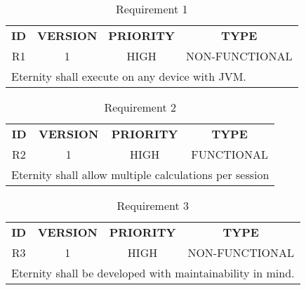 \documentclass[11pt,a4paper]{report}
\theoremstyle{definition}
\theoremstyle{remark}
\begin{document}
        \begin{table}[ht]
            \centering
                \begin{tabular}{cccc} %
                    \textbf{ID} & \textbf{VERSION} & \textbf{PRIORITY} & \textbf{TYPE}\\
                            R1  &           1      &           HIGH    &      NON-FUNCTIONAL\\
                    \hline
                    \multicolumn{4}{l}{Eternity shall execute on any device with JVM.}
                \end{tabular}
                \caption{Requirement 1}
                \label{tab:table-requirements-1}
            \end{table}
            \vspace{3em}
            
            \begin{table}[ht]
            \centering
                \begin{tabular}{cccc} %
                    \textbf{ID} & \textbf{VERSION} & \textbf{PRIORITY} & \textbf{TYPE}\\
                            R2  &           1      &           HIGH    &      FUNCTIONAL\\
                    \hline
                    \multicolumn{4}{l}{Eternity shall allow multiple calculations per session}
                \end{tabular}
                \caption{Requirement 2}
                \label{tab:table-requirements-2}
            \end{table}
            \vspace{3em}
            
            \begin{table}[ht]
            \centering
                \begin{tabular}{cccc} %
                    \textbf{ID} & \textbf{VERSION} & \textbf{PRIORITY} & \textbf{TYPE}\\
                            R3  &           1      &           HIGH    &      NON-FUNCTIONAL\\
                    \hline
                    \multicolumn{4}{l}{Eternity shall be developed with maintainability in mind.}
                \end{tabular}
                \caption{Requirement 3}
                \label{tab:table-requirements-3}
            \end{table}
            \vspace{3em}
    
\end{document}
